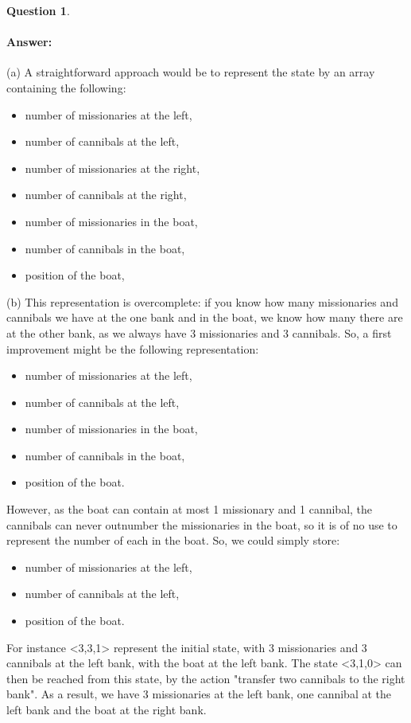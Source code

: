 \documentclass[11pt,a4paper]{article}
\theoremstyle{definition}%
\newtheorem{Q}{Question}[] %
\newcommand{\reponse}[1]{%
\ifthenelse {\boolean{corrige}} {\paragraph{Answer:} \color{darkblue}   #1\color{black}} {}
}
\begin{document}
\begin{Q}
\reponse{
    (a) A straightforward approach would be to represent the state by an array containing the
following:
\begin{itemize}
    \item number of missionaries at the left,
    \item number of cannibals at the left,
    \item number of missionaries at the right,
    \item number of cannibals at the right,
    \item number of missionaries in the boat,
    \item number of cannibals in the boat,
    \item position of the boat,
\end{itemize}
(b) This representation is overcomplete: if you know how many missionaries and cannibals
we have at the one bank and in the boat, we know how many there are at the other
bank, as we always have 3 missionaries and 3 cannibals. So, a first improvement might
be the following representation:
\begin{itemize}
    \item  number of missionaries at the left,
    \item  number of cannibals at the left,
    \item  number of missionaries in the boat,
    \item  number of cannibals in the boat,
    \item  position of the boat.
\end{itemize}
However, as the boat can contain at most 1 missionary and 1 cannibal, the cannibals
can never outnumber the missionaries in the boat, so it is of no use to represent the
number of each in the boat. So, we could simply store:
\begin{itemize}
    \item number of missionaries at the left,
    \item number of cannibals at the left,
    \item position of the boat. 
\end{itemize}
For instance <3,3,1> represent the initial state, with 3 missionaries and 3 cannibals
at the left bank, with the boat at the left bank. The state <3,1,0> can then be
reached from this state, by the action "transfer two cannibals to the right bank". As a
result, we have 3 missionaries at the left bank, one cannibal at the left bank and the
boat at the right bank.\\
}
\end{Q}
\end{document}
